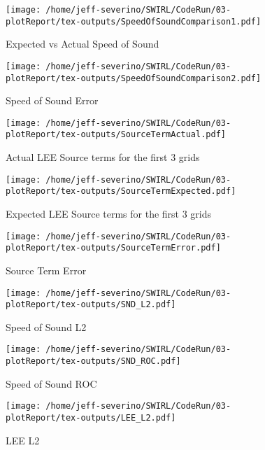 \documentclass[a4paper]{article}
\begin{document}
 \begin{figure}
     \centering
     \texttt{[image: /home/jeff-severino/SWIRL/CodeRun/03-plotReport/tex-outputs/SpeedOfSoundComparison1.pdf]}
     \caption{Expected vs Actual Speed of Sound}
 \end{figure}

 \begin{figure}
     \centering
     \texttt{[image: /home/jeff-severino/SWIRL/CodeRun/03-plotReport/tex-outputs/SpeedOfSoundComparison2.pdf]}
     \caption{Speed of Sound Error}
 \end{figure}


 \begin{figure}
     \centering
     \texttt{[image: /home/jeff-severino/SWIRL/CodeRun/03-plotReport/tex-outputs/SourceTermActual.pdf]}
     \caption{Actual LEE Source terms for the first 3 grids}
 \end{figure}

 \begin{figure}
     \centering
     \texttt{[image: /home/jeff-severino/SWIRL/CodeRun/03-plotReport/tex-outputs/SourceTermExpected.pdf]}
     \caption{Expected LEE Source terms for the first 3 grids}
 \end{figure}


 \begin{figure}
     \centering
     \texttt{[image: /home/jeff-severino/SWIRL/CodeRun/03-plotReport/tex-outputs/SourceTermError.pdf]}
     \caption{Source Term Error}
 \end{figure}



 \begin{figure}
     \centering
     \texttt{[image: /home/jeff-severino/SWIRL/CodeRun/03-plotReport/tex-outputs/SND\_L2.pdf]}
     \caption{Speed of Sound L2}
 \end{figure}


 \begin{figure}
     \centering
     \texttt{[image: /home/jeff-severino/SWIRL/CodeRun/03-plotReport/tex-outputs/SND\_ROC.pdf]}
     \caption{Speed of Sound ROC}
 \end{figure}


 \begin{figure}
     \centering
     \texttt{[image: /home/jeff-severino/SWIRL/CodeRun/03-plotReport/tex-outputs/LEE\_L2.pdf]}
     \caption{LEE L2}
 \end{figure}
\end{document}
